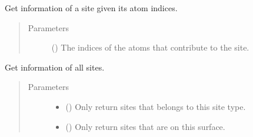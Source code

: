 \documentclass[letterpaper,10pt,english]{sphinxmanual}
\begin{document}
\begin{fulllineitems}
\begin{fulllineitems}
\label{\detokenize{modules:acat.adsorption_sites.ClusterAdsorptionSites.get_site}}
Get information of a site given its atom indices.
\begin{quote}\begin{description}
\item[{Parameters}] \leavevmode
{} () \textendash{} The indices of the atoms that contribute to the site.

\end{description}\end{quote}

\end{fulllineitems}


\begin{fulllineitems}
\label{\detokenize{modules:acat.adsorption_sites.ClusterAdsorptionSites.get_sites}}
Get information of all sites.
\begin{quote}\begin{description}
\item[{Parameters}] \leavevmode\begin{itemize}
\item {} 
 (\sphinxstyleliteralemphasis{\sphinxupquote{, }}) \textendash{} Only return sites that belongs to this site type.

\item {} 
 (\sphinxstyleliteralemphasis{\sphinxupquote{, }}) \textendash{} Only return sites that are on this surface.


\end{itemize}
\end{description}
\end{quote}
\end{fulllineitems}
\end{fulllineitems}
\end{document}
